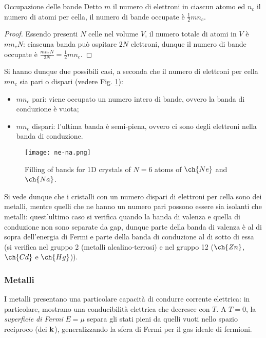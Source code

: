 \begin{proposition}{Occupazione delle bande}{}
	Detto $ m $ il numero di elettroni in ciascun atomo ed $ n_c $ il numero di atomi per cella, il numero di bande occupate è $ \frac{1}{2} m n_c $.

	\tcblower

	\begin{proof}
		Essendo presenti $ N $ celle nel volume $ V $, il numero totale di atomi in $ V $ è $ m n_c N $: ciascuna banda può ospitare $ 2N $ elettroni, dunque il numero di bande occupate è $ \frac{m n_c N}{2N} = \frac{1}{2} m n_c $.
	\end{proof}
\end{proposition}

Si hanno dunque due possibili casi, a seconda che il numero di elettroni per cella $ m n_c $ sia pari o dispari (vedere Fig. \ref{ne-na}):
\begin{itemize}
	\item $ m n_c $ pari: viene occupato un numero intero di bande, ovvero la banda di conduzione è vuota;
	\item $ m n_c $ dispari: l'ultima banda è semi-piena, ovvero ci sono degli elettroni nella banda di conduzione.
\end{itemize}

\begin{figure}
	\centering
	\texttt{[image: ne-na.png]}
	\caption{Filling of bands for 1D crystals of $ N = 6 $ atoms of $ \ch{Ne} $ and $ \ch{Na} $.}
	\label{ne-na}
\end{figure}

Si vede dunque che i cristalli con un numero dispari di elettroni per cella sono dei metalli, mentre quelli che ne hanno un numero pari possono essere sia isolanti che metalli: quest'ultimo caso si verifica quando la banda di valenza e quella di conduzione non sono separate da gap, dunque parte della banda di valenza è al di sopra dell'energia di Fermi e parte della banda di conduzione al di sotto di essa (si verifica nel gruppo 2 (metalli alcalino-terrosi) e nel gruppo 12 ($ \ch{Zn} $, $ \ch{Cd} $ e $ \ch{Hg} $)).

\subsubsection{Metalli}

I metalli presentano una particolare capacità di condurre corrente elettrica\footnotemark: in particolare, mostrano una conducibilità elettrica che decresce con $ T $.
A $ T = 0 $, la \textit{superficie di Fermi} $ E = \mu $ separa gli stati pieni da quelli vuoti nello spazio reciproco (dei $ \mathbf{k} $), generalizzando la sfera di Fermi per il gas ideale di fermioni.

